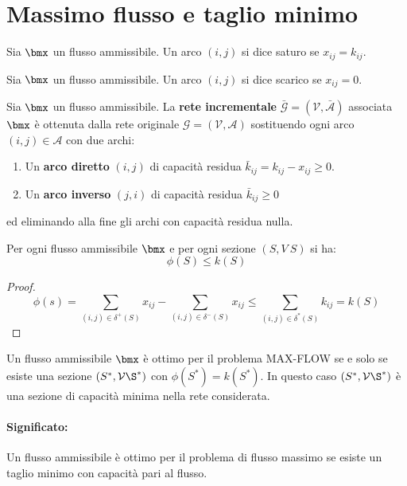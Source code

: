 \documentclass[\main/main.tex]{subfiles}
\begin{document}
\section{Massimo flusso e taglio minimo}

\begin{definition}
  Sia $\bmx$ un flusso ammissibile. Un arco $(i,j)$ si dice saturo se $x_{ij}=k_{ij}$.
\end{definition}

\begin{definition}
  Sia $\bmx$ un flusso ammissibile. Un arco $(i,j)$ si dice scarico se $x_{ij}=0$.
\end{definition}

\begin{definition}
  Sia $\bmx$ un flusso ammissibile. La \textbf{rete incrementale} $\bar{\mathcal{G}} = (\mathcal{V}, \bar{\mathcal{A}})$ associata $\bmx$ è ottenuta dalla rete originale $\mathcal{G} = (\mathcal{V}, \mathcal{A})$ sostituendo ogni arco $(i,j) \in \mathcal{A}$ con due archi:
  \begin{enumerate}
    \item Un \textbf{arco diretto} $(i,j)$ di capacità residua $\bar{k}_{ij} = k_{ij} - x_{ij} \geq 0$.
    \item Un \textbf{arco inverso} $(j,i)$ di capacità residua $\bar{k}_{ij} \geq 0$
  \end{enumerate}
  ed eliminando alla fine gli archi con capacità residua nulla.
\end{definition}

\begin{theorem}
  \label{serve_qui}
  Per ogni flusso ammissibile $\bmx$ e per ogni sezione $(S, V\ S)$ si ha:
  \[
    \phi(S) \leq k(S)
  \]
\end{theorem}

\begin{proof}
  \[
    \phi(s) = \sum_{(i,j) \in \delta^{+}(S)} x_{ij} - \sum_{(i,j) \in \delta^{-}(S)} x_{ij} \leq \sum_{(i,j) \in  \delta^{*}(S)} k_{ij} = k(S)
  \]
\end{proof}

\begin{theorem}
  Un flusso ammissibile $\bmx$ è ottimo per il problema MAX-FLOW se e solo se esiste una sezione $(S^*, \mathcal{V}\S^*)$ con $\phi(S^*)=k(S^*)$. In questo caso $(S^*, \mathcal{V}\S^*)$ è una sezione di capacità minima nella rete considerata.
  \paragraph*{Significato:} Un flusso ammissibile è ottimo per il problema di flusso massimo se esiste un taglio minimo con capacità pari al flusso.
\end{theorem}
\end{document}
